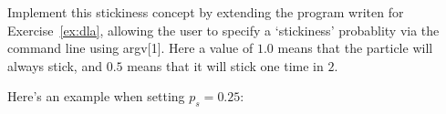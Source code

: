 \begin{exercise}
Implement this stickiness concept by extending the program writen for Exercise~\ref{ex:dla}, allowing the user to specify a `stickiness' probablity via the command line using argv[1]. Here a value of $1.0$ means that the particle will always stick, and $0.5$ means that it will stick one time in $2$.
\end{exercise}
\noindent Here's an example when setting $p_s=0.25$:
\begin{center}
\end{center}
